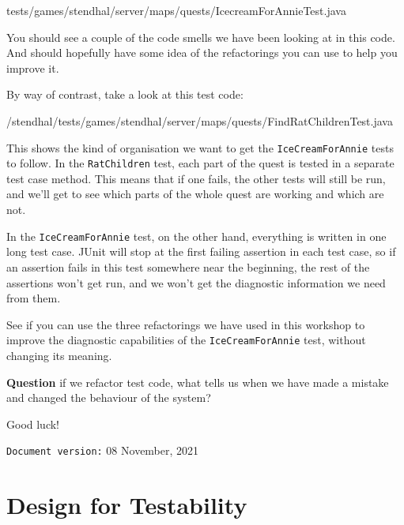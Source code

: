 \documentclass[
]{book}
\newenvironment{Shaded}{\begin{snugshade}}{\end{snugshade}}
\newcommand{\FunctionTok}[1]{\textcolor[rgb]{0.00,0.00,0.00}{#1}}
\newcommand{\NormalTok}[1]{#1}
\begin{document}
\begin{Shaded}
\begin{Highlighting}[]
\NormalTok{tests/games/stendhal/server/maps/quests/IcecreamForAnnieTest.}\FunctionTok{java}
\end{Highlighting}
\end{Shaded}

You should see a couple of the code smells we have been looking at in this code. And should hopefully have some idea of the refactorings you can use to help you improve it.

By way of contrast, take a look at this test code:

\begin{Shaded}
\begin{Highlighting}[]
\NormalTok{/stendhal/tests/games/stendhal/server/maps/quests/FindRatChildrenTest.}\FunctionTok{java}
\end{Highlighting}
\end{Shaded}

This shows the kind of organisation we want to get the \texttt{IceCreamForAnnie} tests to follow. In the \texttt{RatChildren} test, each part of the quest is tested in a separate test case method. This means that if one fails, the other tests will still be run, and we'll get to see which parts of the whole quest are working and which are not.

In the \texttt{IceCreamForAnnie} test, on the other hand, everything is written in one long test case. JUnit will stop at the first failing assertion in each test case, so if an assertion fails in this test somewhere near the beginning, the rest of the assertions won't get run, and we won't get the diagnostic information we need from them.

See if you can use the three refactorings we have used in this workshop to improve the diagnostic capabilities of the \texttt{IceCreamForAnnie} test, without changing its meaning.

\textbf{Question} if we refactor test code, what tells us when we have made a mistake and changed the behaviour of the system?

Good luck!

\texttt{Document\ version:} 08 November, 2021

\hypertarget{designing}{%
\chapter{Design for Testability}\label{designing}}
\end{document}
